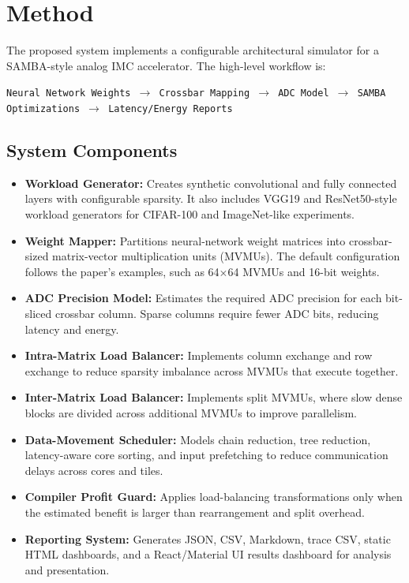 \documentclass[11pt]{article}
\begin{document}
\section{Method}

The proposed system implements a configurable architectural simulator for a SAMBA-style analog IMC accelerator. The high-level workflow is:

\begin{center}
\texttt{Neural Network Weights $\rightarrow$ Crossbar Mapping $\rightarrow$ ADC Model $\rightarrow$ SAMBA Optimizations $\rightarrow$ Latency/Energy Reports}
\end{center}

\subsection{System Components}

\begin{itemize}
    \item \textbf{Workload Generator:} Creates synthetic convolutional and fully connected layers with configurable sparsity. It also includes VGG19 and ResNet50-style workload generators for CIFAR-100 and ImageNet-like experiments.
    \item \textbf{Weight Mapper:} Partitions neural-network weight matrices into crossbar-sized matrix-vector multiplication units (MVMUs). The default configuration follows the paper's examples, such as 64$\times$64 MVMUs and 16-bit weights.
    \item \textbf{ADC Precision Model:} Estimates the required ADC precision for each bit-sliced crossbar column. Sparse columns require fewer ADC bits, reducing latency and energy.
    \item \textbf{Intra-Matrix Load Balancer:} Implements column exchange and row exchange to reduce sparsity imbalance across MVMUs that execute together.
    \item \textbf{Inter-Matrix Load Balancer:} Implements split MVMUs, where slow dense blocks are divided across additional MVMUs to improve parallelism.
    \item \textbf{Data-Movement Scheduler:} Models chain reduction, tree reduction, latency-aware core sorting, and input prefetching to reduce communication delays across cores and tiles.
    \item \textbf{Compiler Profit Guard:} Applies load-balancing transformations only when the estimated benefit is larger than rearrangement and split overhead.
    \item \textbf{Reporting System:} Generates JSON, CSV, Markdown, trace CSV, static HTML dashboards, and a React/Material UI results dashboard for analysis and presentation.
\end{itemize}
\end{document}
